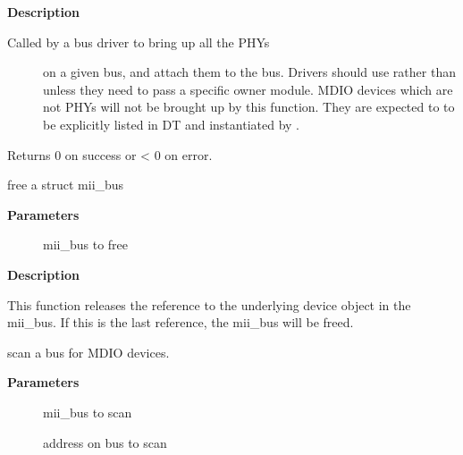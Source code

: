 \documentclass[a4paper,8pt,english]{sphinxmanual}
\begin{document}
\textbf{Description}
\begin{description}
\item[{Called by a bus driver to bring up all the PHYs}] \leavevmode
on a given bus, and attach them to the bus. Drivers should use
 rather than {\hyperref[networking/kapi:c.__mdiobus_register]{\emph{}}} unless they
need to pass a specific owner module. MDIO devices which are not
PHYs will not be brought up by this function. They are expected to
to be explicitly listed in DT and instantiated by .

\end{description}

Returns 0 on success or \textless{} 0 on error.

\begin{fulllineitems}
\label{networking/kapi:c.mdiobus_free}
free a struct mii\_bus

\end{fulllineitems}


\textbf{Parameters}
\begin{description}
\item[{}] \leavevmode
mii\_bus to free

\end{description}

\textbf{Description}

This function releases the reference to the underlying device
object in the mii\_bus.  If this is the last reference, the mii\_bus
will be freed.

\begin{fulllineitems}
\label{networking/kapi:c.mdiobus_scan}
scan a bus for MDIO devices.

\end{fulllineitems}


\textbf{Parameters}
\begin{description}
\item[{}] \leavevmode
mii\_bus to scan

\item[{}] \leavevmode
address on bus to scan

\end{description}
\end{document}
